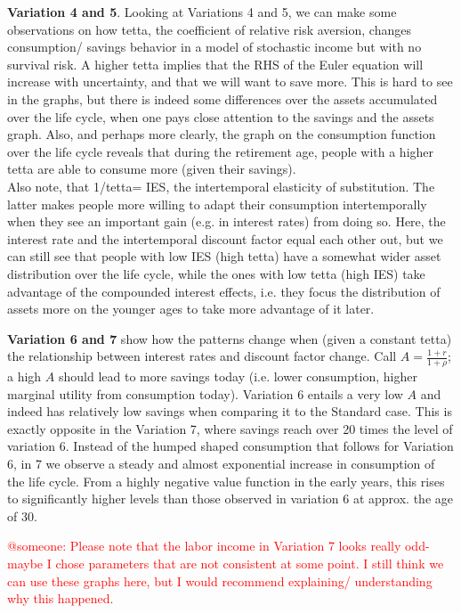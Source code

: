 \documentclass[12pt,a4paper]{article}
\begin{document}
\textbf{Variation 4 and 5}. Looking at Variations 4 and 5, we can make some observations on how tetta, the coefficient of relative risk aversion, changes consumption/ savings behavior in a model of stochastic income but with no survival risk. A higher tetta implies that the RHS of the Euler equation will increase with uncertainty, and that we will want to save more. This is hard to see in the graphs, but there is indeed some differences over the assets accumulated over the life cycle, when one pays close attention to the savings and the assets graph. Also, and perhaps more clearly, the graph on the consumption function over the life cycle reveals that during the retirement age, people with a higher tetta are able to consume more (given their savings).\\
Also note, that 1/tetta= IES, the intertemporal elasticity of substitution. The latter makes people more willing to adapt their consumption intertemporally when they see an important gain (e.g. in interest rates) from doing so. Here, the interest rate and the intertemporal discount factor equal each other out, but we can still see that people with low IES (high tetta) have a somewhat wider asset distribution over the life cycle, while the ones with low tetta (high IES) take advantage of the compounded interest effects, i.e. they focus the distribution of assets more on the younger ages to take more advantage of it later. 

\textbf{Variation 6 and 7} show how the patterns change when (given a constant tetta) the relationship between interest rates and discount factor change. Call $A = \frac{1+r}{1+\rho}$; a high $A$ should lead to more savings today (i.e. lower consumption, higher marginal utility from consumption today). Variation 6 entails a very low $A$ and indeed has relatively low savings when comparing it to the Standard case. This is exactly opposite in the Variation 7, where savings reach over 20 times the level of variation 6. Instead of the humped shaped consumption that follows for Variation 6, in 7 we observe a steady and almost exponential increase in consumption of the life cycle. From a highly negative value function in the early years, this rises to significantly higher levels than those observed in variation 6 at approx. the age of 30. 

\textcolor{red}{@someone: Please note that the labor income in Variation 7 looks really odd- maybe I chose parameters that are not consistent at some point. I still think we can use these graphs here, but I would recommend explaining/ understanding why this happened. }
\end{document}
